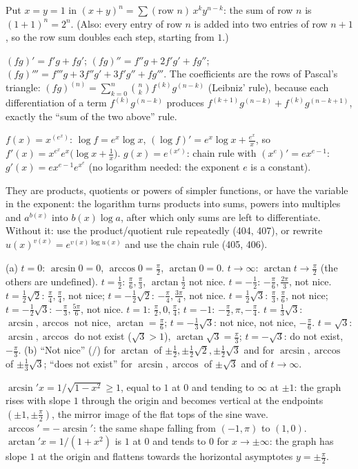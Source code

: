  Put $x=y=1$ in $(x+y)^n=\sum(\text{row }n)\,x^ky^{n-k}$: the sum of row $n$ is $(1+1)^n=2^n$. (Also: every entry of row $n$ is added into two entries of row $n+1$, so the row sum doubles each step, starting from $1$.)

 $(fg)'=f'g+fg'$; $(fg)''=f''g+2f'g'+fg''$; $(fg)'''=f'''g+3f''g'+3f'g''+fg'''$. The coefficients are the rows of Pascal's triangle: $(fg)^{(n)}=\sum_{k=0}^n\binom nkf^{(k)}g^{(n-k)}$ (Leibniz' rule), because each differentiation of a term $f^{(k)}g^{(n-k)}$ produces $f^{(k+1)}g^{(n-k)}+f^{(k)}g^{(n-k+1)}$, exactly the ``sum of the two above'' rule.

 $f(x)=x^{(e^x)}$: $\log f=e^x\log x$, $(\log f)'=e^x\log x+\frac{e^x}x$, so $f'(x)=x^{e^x}e^x\big(\log x+\frac1x\big)$. $g(x)=e^{(x^e)}$: chain rule with $(x^e)'=ex^{e-1}$: $g'(x)=ex^{e-1}e^{x^e}$ (no logarithm needed: the exponent $e$ is a constant).

 They are products, quotients or powers of simpler functions, or have the variable in the exponent: the logarithm turns products into sums, powers into multiples and $a^{b(x)}$ into $b(x)\log a$, after which only sums are left to differentiate. Without it: use the product/quotient rule repeatedly (404, 407), or rewrite $u(x)^{v(x)}=e^{v(x)\log u(x)}$ and use the chain rule (405, 406).

 (a) $t=0$: $\arcsin0=0$, $\arccos0=\frac\pi2$, $\arctan0=0$. $t\to\infty$: $\arctan t\to\frac\pi2$ (the others are undefined). $t=\frac12$: $\frac\pi6,\frac\pi3$, $\arctan\frac12$ not nice. $t=-\frac12$: $-\frac\pi6,\frac{2\pi}3$, not nice. $t=\frac12\sqrt2$: $\frac\pi4,\frac\pi4$, not nice; $t=-\frac12\sqrt2$: $-\frac\pi4,\frac{3\pi}4$, not nice. $t=\frac12\sqrt3$: $\frac\pi3,\frac\pi6$, not nice; $t=-\frac12\sqrt3$: $-\frac\pi3,\frac{5\pi}6$, not nice. $t=1$: $\frac\pi2,0,\frac\pi4$; $t=-1$: $-\frac\pi2,\pi,-\frac\pi4$. $t=\frac13\sqrt3$: $\arcsin,\arccos$ not nice, $\arctan=\frac\pi6$; $t=-\frac13\sqrt3$: not nice, not nice, $-\frac\pi6$. $t=\sqrt3$: $\arcsin,\arccos$ do not exist ($\sqrt3>1$), $\arctan\sqrt3=\frac\pi3$; $t=-\sqrt3$: do not exist, $-\frac\pi3$. (b) ``Not nice'' ($/$) for $\arctan$ of $\pm\frac12,\pm\frac12\sqrt2,\pm\frac12\sqrt3$ and for $\arcsin,\arccos$ of $\pm\frac13\sqrt3$; ``does not exist'' for $\arcsin,\arccos$ of $\pm\sqrt3$ and of $t\to\infty$.

 $\arcsin'x=1/\sqrt{1-x^2}\ge1$, equal to $1$ at $0$ and tending to $\infty$ at $\pm1$: the graph rises with slope $1$ through the origin and becomes vertical at the endpoints $(\pm1,\pm\frac\pi2)$, the mirror image of the flat tops of the sine wave. $\arccos'=-\arcsin'$: the same shape falling from $(-1,\pi)$ to $(1,0)$. $\arctan'x=1/(1+x^2)$ is $1$ at $0$ and tends to $0$ for $x\to\pm\infty$: the graph has slope $1$ at the origin and flattens towards the horizontal asymptotes $y=\pm\frac\pi2$.

